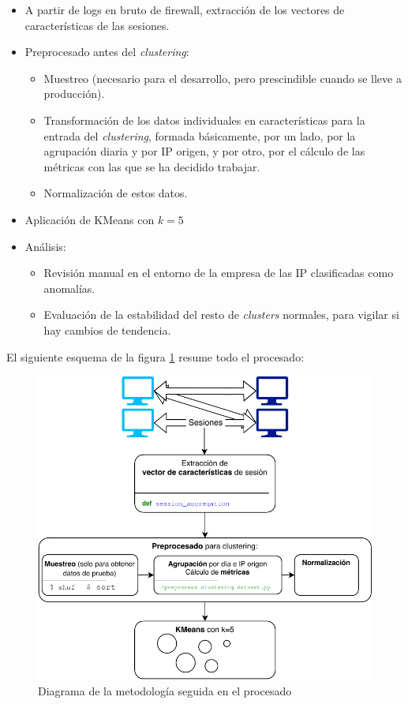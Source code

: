 \begin{itemize}

\item A partir de logs en bruto de firewall, extracción de los vectores de características de las sesiones.

\item Preprocesado antes del \emph{clustering}:

    \begin{itemize}

        \item Muestreo (necesario para el desarrollo, pero prescindible cuando se lleve a producción).

        \item Transformación de los datos individuales en características para la entrada del \emph{clustering},
            formada básicamente, por un lado, por la agrupación diaria y por IP origen, y por otro, por el cálculo de las métricas con las que se ha decidido trabajar.

        \item Normalización de estos datos.

    \end{itemize}

\item Aplicación de KMeans con $k=5$

\item Análisis:

    \begin{itemize}

        \item Revisión manual en el entorno de la empresa de las IP clasificadas como anomalías.

        \item Evaluación de la estabilidad del resto de \emph{clusters} normales, para vigilar si hay cambios de tendencia.

    \end{itemize}

\end{itemize}

El siguiente esquema de la figura \ref{fig:esquema} resume todo el procesado:

\begin{figure}[h]
    \centering
    \includegraphics{contenido/fig/esquema.pdf}
    \caption{Diagrama de la metodología seguida en el procesado}
    \label{fig:esquema}
\end{figure}
